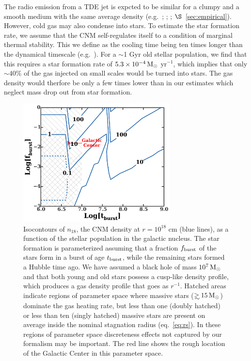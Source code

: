 \documentclass[usenatbib,fleqn]{mnras}
\newcommand\gsim{\mathrel{\rlap{\lower4pt\hbox{\hskip1pt$\sim$}}
    \raise1pt\hbox{$>$}}}
\newcommand{\Msun}{{\rm M_\odot}}
\begin{document}
The radio emission from a TDE jet is expcted to be similar for a
clumpy and a smooth medium with the same average density
(e.g.~\citealt{Nakar&Granot2007}; \citealt{Mimica&Giannios2009};
\citealt{vanEerten+2009}; $\S$~\ref{sec:empirical}).  However, cold gas
may also condense into stars.  To estimate the star formation rate, we
assume that the CNM self-regulates itself to a condition of marginal
thermal stability.  This we define as the cooling time being ten times
longer than the dynamical timescale (e.g.~\citealt{McCourt+09}). For a
$\sim$1 Gyr old stellar population, we find that this requires a star
formation rate of $5.3 \times 10^{-4} \,\Msun$ yr$^{-1}$, which
implies that only $\sim 40$\% of the gas injected on small scales
would be turned into stars.  The gas density would therfore be only a
few times lower than in our estimates which neglect mass drop out from
star formation.

\begin{figure} 
  \includegraphics[width=8cm]{cnm_plot.pdf}
  \caption{\label{fig:param} Isocontours of $n_{18}$, the CNM density
    at $r = 10^{18}$ cm (blue lines), as a function of the stellar
    population in the galactic nucleus.  The star formation is
    parameterized assuming that a fraction $f_{\rm burst}$ of the
    stars form in a burst of age $t_{\rm burst}$, while the remaining
    stars formed a Hubble time ago.  We have assumed a black hole of
    mass $10^{7} \, \Msun$ and that both young and old stars possess a
    cusp-like density profile, which produces a gas density profile
    that goes as $r^{-1}$.  Hatched areas indicate regions of
    parameter space where massive stars ($\gsim 15 \, \Msun$) dominate
    the gas heating rate, but less than one (doubly hatched) or less
    than ten (singly hatched) massive stars are present on average
    inside the nominal stagnation radius (eq.~\ref{eq:rs}).  In these
    regions of parameter space discreteness effects not captured by
    our formalism may be important. The red line shows the rough location of
    the Galactic Center in this parameter space.}
\end{figure}
\end{document}
